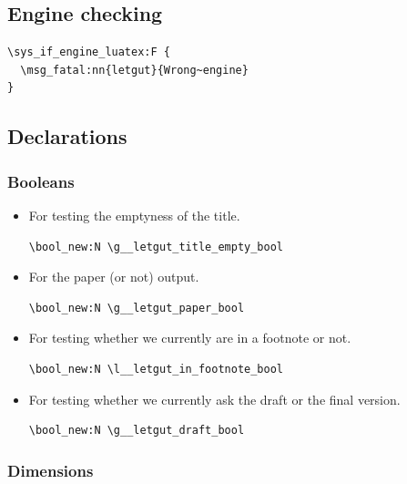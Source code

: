 \documentclass{letgut}
\begin{document}
\subsection{Engine checking}
\label{sec:org5711d86}

\begin{lstlisting}
\sys_if_engine_luatex:F {
  \msg_fatal:nn{letgut}{Wrong~engine}
}
\end{lstlisting}

\subsection{Declarations}
\label{sec:orga63e6a8}

\subsubsection{Booleans}
\label{sec:orge5b5c6b}

\begin{itemize}
\item For testing the emptyness of the title.
\begin{lstlisting}
\bool_new:N \g__letgut_title_empty_bool
\end{lstlisting}
\item For the paper (or not) output.
\begin{lstlisting}
\bool_new:N \g__letgut_paper_bool
\end{lstlisting}
\item For testing whether we currently are in a footnote or not.
\begin{lstlisting}
\bool_new:N \l__letgut_in_footnote_bool
\end{lstlisting}
\item For testing whether we currently ask the draft or the final version.
\begin{lstlisting}
\bool_new:N \g__letgut_draft_bool
\end{lstlisting}
\end{itemize}

\subsubsection{Dimensions}
\label{sec:org61842b5}
\end{document}
